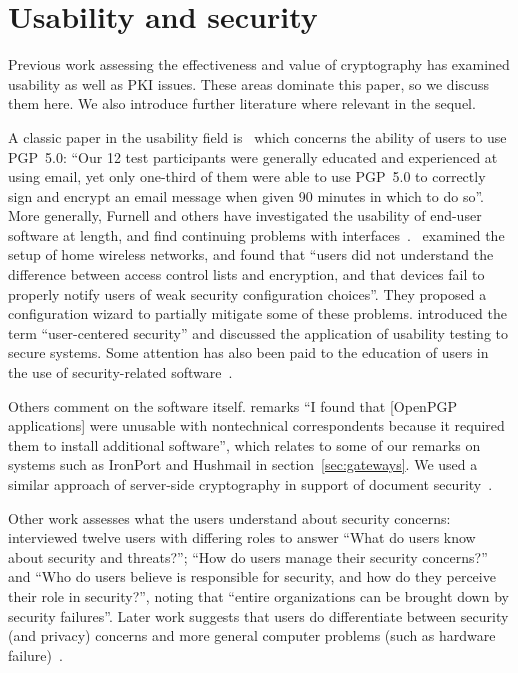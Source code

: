 \documentclass{article}
\def\citeN{\citet}
\def\cite{\citep}
\begin{document}
\section{Usability and security}\label{sec:user}

Previous work assessing the effectiveness and value of cryptography
has examined usability as well as PKI issues.  These
areas dominate this paper, so we discuss them here.  
We also introduce further literature where relevant in the sequel.

A classic paper in the usability field is~\citeN{Whitten+05} which
concerns the ability of users to use PGP~5.0: ``Our 12 test participants were generally educated and experienced at using email, yet only one-third of them were able to use PGP~5.0 to correctly sign and encrypt an email message when given 90 minutes in which to do so''.  More generally, Furnell
and others have investigated the usability of end-user software at
length, and find continuing problems with
interfaces~\cite{Furnell+06,Furnell07,Ibrahim+10,Sweikata+09,Cranor+05,Gutmann+05}.
\citeN{Ho+10}~examined the setup of home wireless networks, and found
that “users did not understand the difference between access control
lists and encryption, and that devices fail to properly notify users
of weak security configuration choices”.  They proposed a configuration
wizard to partially mitigate some of these problems.  \citeN{Zurko+96}
introduced the term “user-centered security” and discussed the
application of usability testing to secure systems.  Some attention
has also been paid to the education of users in the use of security-related
software~\cite{Reid+05}.  

Others comment on the software itself.  \citeN{Kapadia07} remarks ``I found that
[OpenPGP applications] were unusable with nontechnical correspondents
because it required them to install additional software'', which
relates to some of our remarks on systems such as IronPort and
Hushmail in section~\ref{sec:gateways}.  We used a similar approach of
server-side cryptography in support of document
security~\cite{Brooke+09b}.  

Other work assesses what the users
understand about security concerns: \citeN{Gross+07} interviewed
twelve users with differing roles to answer “What do users know about
security and threats?”; “How do users manage their security concerns?”
and “Who do users believe is responsible for security, and how do they
perceive their role in security?”, noting that “entire organizations
can be brought down by security failures”.  Later work suggests that
users do differentiate between security (and privacy) concerns and
more general computer problems (such as hardware
failure)~\cite{Gross+07b}.
\end{document}
